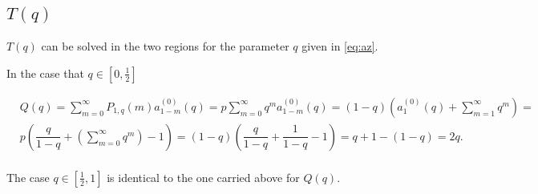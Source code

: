 \documentclass[letterpaper,12pt]{report}
\theoremstyle{plain}
\theoremstyle{definition}
\begin{document}
\subsection{$\mathit{T}(q)$ } \label{app:calctofp} 

$\mathit{T}(q)$  can be solved in the two regions for the parameter $q$ given in \ref{eq:az}.

In the case  that $q\in [0,\frac{1}{2}]$

\begin{eqnarray}\label{eq:rpcalc}\nonumber
&\mathit{Q}(q)=\sum_{m=0}^{\infty}\mathit{P}_{1,q}(m)\mathit{a}^{(0)}_{1-m}(q)=p\sum_{m=0}^{\infty}q^m\mathit{a}^{(0)}_{1-m}(q)=(1-q)\left(
\mathit{a}^{(0)}_1(q)+\sum_{m=1}^{\infty}q^m
 \right)=\\\nonumber
 &p\left(
\dfrac{q}{1-q}+\left(\sum_{m=0}^{\infty}q^m\right)-1
 \right) 
 =(1-q)\left(
\dfrac{q}{1-q}+\dfrac{1}{1-q}-1
 \right)=q+1-(1-q)=2q.\\\nonumber
\end{eqnarray}

The case $q\in [\frac{1}{2},1]$ is identical to the one carried above for $\mathit{Q}(q)$.
\end{document}
